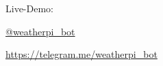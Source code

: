 \begin{frame}[standout]
  Live-Demo:

  \url{@weatherpi\_bot}

  \url{https://telegram.me/weatherpi_bot}
\end{frame}

